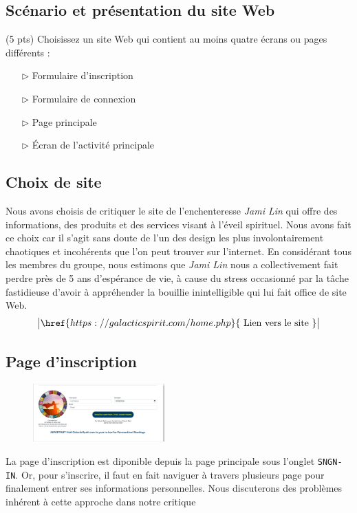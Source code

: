 \documentclass[9pt]{report}
\begin{document}
\begin{multicols*}{2}
  \small
\chapter{Scénario et présentation du site Web}



  \begin{Exercice}{(5 pts)}{}
  Choisissez un site Web qui contient au moins quatre écrans ou pages différents :     
  \begin{itemize}
    \item [$\rhd$ ] Formulaire d’inscription
    \item [$\rhd$ ] Formulaire de connexion  
    \item [$\rhd$ ] Page principale  
    \item [$\rhd$ ] Écran de l'activité principale 
  \end{itemize} 
  \end{Exercice}


  \section{Choix de site}
  Nous avons choisis de critiquer le site de l'enchenteresse \textit{Jami Lin} 
  qui offre des informations, des produits et des services visant à l'éveil 
  spirituel. Nous avons fait ce choix car il s'agit sans doute de l'un des 
  design les plus involontairement chaotiques et incohérents que l'on peut trouver 
  sur l'internet. En considérant tous les membres du groupe, nous estimons 
  que \textit{Jami Lin}  nous a collectivement fait perdre près de 5 ans d'espérance de vie, 
  à cause du stress occasionné par la tâche fastidieuse d'avoir à appréhender la bouillie 
  inintelligible qui lui fait office de site Web. 
  \[ \big| \href{https://galacticspirit.com/home.php}{\text{ Lien vers le site }}  \big| \]

  \vspace{-1em}

  \section{Page d'inscription}
  \vspace{-2em}
  \begin{figure}[H]
    \begin{center}
      \includegraphics[width=0.45\textwidth]{SinupPage.png}
    \end{center}
  \end{figure}
  \vspace{-2.5em}
  La page d'inscription est diponible depuis la page principale sous l'onglet 
  \texttt{SNGN-IN}. Or, pour s'inscrire, il faut en fait naviguer à travers plusieurs 
  page pour finalement entrer ses informations personnelles. Nous discuterons 
  des problèmes inhérent à cette approche dans notre critique



\end{multicols*}
\end{document}
